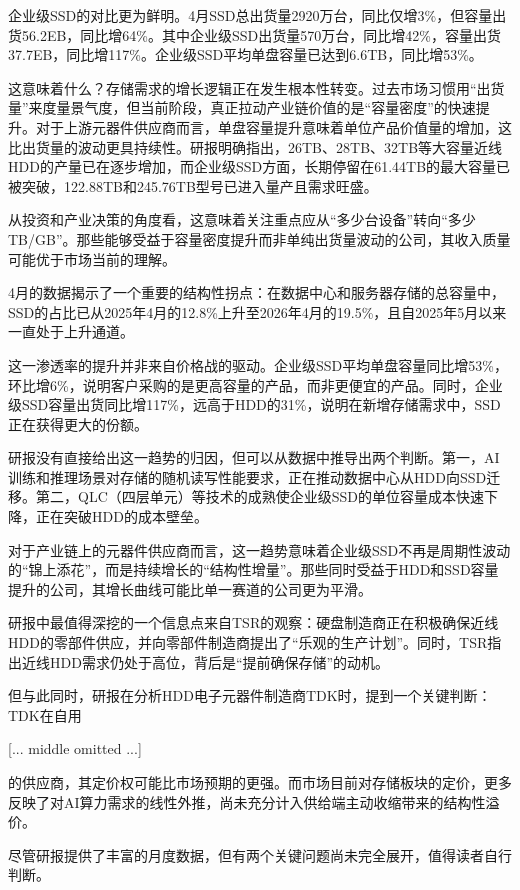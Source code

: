 \documentclass[11pt]{ctexart}
\begin{document}
企业级SSD的对比更为鲜明。4月SSD总出货量2920万台，同比仅增3\%，但容量出货56.2EB，同比增64\%。其中企业级SSD出货量570万台，同比增42\%，容量出货37.7EB，同比增117\%。企业级SSD平均单盘容量已达到6.6TB，同比增53\%。

这意味着什么？存储需求的增长逻辑正在发生根本性转变。过去市场习惯用“出货量”来度量景气度，但当前阶段，真正拉动产业链价值的是“容量密度”的快速提升。对于上游元器件供应商而言，单盘容量提升意味着单位产品价值量的增加，这比出货量的波动更具持续性。研报明确指出，26TB、28TB、32TB等大容量近线HDD的产量已在逐步增加，而企业级SSD方面，长期停留在61.44TB的最大容量已被突破，122.88TB和245.76TB型号已进入量产且需求旺盛。

从投资和产业决策的角度看，这意味着关注重点应从“多少台设备”转向“多少TB/GB”。那些能够受益于容量密度提升而非单纯出货量波动的公司，其收入质量可能优于市场当前的理解。

4月的数据揭示了一个重要的结构性拐点：在数据中心和服务器存储的总容量中，SSD的占比已从2025年4月的12.8\%上升至2026年4月的19.5\%，且自2025年5月以来一直处于上升通道。

这一渗透率的提升并非来自价格战的驱动。企业级SSD平均单盘容量同比增53\%，环比增6\%，说明客户采购的是更高容量的产品，而非更便宜的产品。同时，企业级SSD容量出货同比增117\%，远高于HDD的31\%，说明在新增存储需求中，SSD正在获得更大的份额。

研报没有直接给出这一趋势的归因，但可以从数据中推导出两个判断。第一，AI训练和推理场景对存储的随机读写性能要求，正在推动数据中心从HDD向SSD迁移。第二，QLC（四层单元）等技术的成熟使企业级SSD的单位容量成本快速下降，正在突破HDD的成本壁垒。

对于产业链上的元器件供应商而言，这一趋势意味着企业级SSD不再是周期性波动的“锦上添花”，而是持续增长的“结构性增量”。那些同时受益于HDD和SSD容量提升的公司，其增长曲线可能比单一赛道的公司更为平滑。

研报中最值得深挖的一个信息点来自TSR的观察：硬盘制造商正在积极确保近线HDD的零部件供应，并向零部件制造商提出了“乐观的生产计划”。同时，TSR指出近线HDD需求仍处于高位，背后是“提前确保存储”的动机。

但与此同时，研报在分析HDD电子元器件制造商TDK时，提到一个关键判断：TDK在自用

[... middle omitted ...]

的供应商，其定价权可能比市场预期的更强。而市场目前对存储板块的定价，更多反映了对AI算力需求的线性外推，尚未充分计入供给端主动收缩带来的结构性溢价。

尽管研报提供了丰富的月度数据，但有两个关键问题尚未完全展开，值得读者自行判断。
\end{document}
